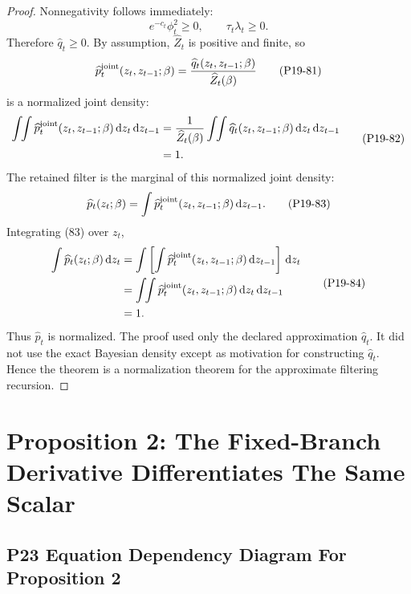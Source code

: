 \documentclass[11pt]{article}
\newcommand{\dd}{\,\mathrm d}
\begin{document}
\begin{proof}
Nonnegativity follows immediately:
\[
    e^{-c_t}\phi_t^2\ge0,
    \qquad
    \tau_t\lambda_t\ge0.
    \tag{P19-80}
\]
Therefore \(\widehat q_t\ge0\).  By assumption,
\(\widehat Z_t\) is positive and finite, so
\[
    \widehat p_t^{\rm joint}(z_t,z_{t-1};\beta)
    =
    \frac{\widehat q_t(z_t,z_{t-1};\beta)}
    {\widehat Z_t(\beta)}
    \tag{P19-81}
\]
is a normalized joint density:
\[
\begin{aligned}
    \int\!\!\int
    \widehat p_t^{\rm joint}(z_t,z_{t-1};\beta)
    \dd z_t\dd z_{t-1}
    &=
    \frac{1}{\widehat Z_t(\beta)}
    \int\!\!\int
    \widehat q_t(z_t,z_{t-1};\beta)
    \dd z_t\dd z_{t-1}\\
    &=
    1.
\end{aligned}
\tag{P19-82}
\]
The retained filter is the marginal of this normalized joint density:
\[
    \widehat p_t(z_t;\beta)
    =
    \int
    \widehat p_t^{\rm joint}(z_t,z_{t-1};\beta)
    \dd z_{t-1}.
    \tag{P19-83}
\]
Integrating (83) over \(z_t\),
\[
\begin{aligned}
    \int \widehat p_t(z_t;\beta)\dd z_t
    &=
    \int
    \left[
    \int \widehat p_t^{\rm joint}(z_t,z_{t-1};\beta)
    \dd z_{t-1}
    \right]\dd z_t\\
    &=
    \int\!\!\int
    \widehat p_t^{\rm joint}(z_t,z_{t-1};\beta)
    \dd z_t\dd z_{t-1}\\
    &=
    1.
\end{aligned}
\tag{P19-84}
\]
Thus \(\widehat p_t\) is normalized.  The proof used only the declared
approximation \(\widehat q_t\).  It did not use the exact Bayesian density
except as motivation for constructing \(\widehat q_t\).  Hence the theorem is a
normalization theorem for the approximate filtering recursion.
\end{proof}

\section{Proposition 2: The Fixed-Branch Derivative Differentiates The Same Scalar}

\subsection*{P23 Equation Dependency Diagram For Proposition 2}
\end{document}
